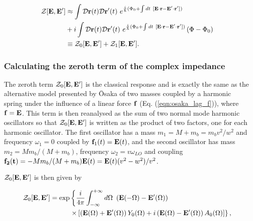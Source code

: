 \begin{equation}
    \begin{aligned}
    \mathcal{Z}[\vb{E}, \vb{E'}] &\approx \int \mathcal{D}\vb{r}(t)\mathcal{D}\vb{r'}(t)\ e^{\frac{i}{\hbar} (\Phi_0 + \int dt\ [\vb{E} \cdot \vb{r} - \vb{E'} \cdot \vb{r'}])} \\
    &+ i\int \mathcal{D}\mathbf{r}(t) \mathcal{D}\mathbf{r'}(t)\ e^{\frac{i}{\hbar} (\Phi_0 + \int dt\ [\vb{E} \cdot \vb{r} - \vb{E'} \cdot \vb{r'}])}\left(\Phi - \Phi_0\right) \\
    &\equiv \mathcal{Z}_0[\vb{E}, \vb{E'}] + \mathcal{Z}_1[\vb{E}, \vb{E'}].
    \end{aligned}
\end{equation}

\subsubsection{Calculating the zeroth term of the complex impedance}
\label{subsubsec:2-3-1-2}

The zeroth term $\mathcal{Z}_0[\vb{E}, \vb{E'}]$ is the classical response and is exactly the same as the alternative model presented by \=Osaka of two masses coupled by a harmonic spring under the influence of a linear force $\vb{f}$ (Eq. (\ref{eqn:osaka_lag_f})), where $\vb{f} = \vb{E}$. This term is then reanalysed as the sum of two normal mode harmonic oscillators so that $\mathcal{Z}_0[\vb{E}, \vb{E'}]$ is written as the product of two factors, one for each harmonic oscillator. The first oscillator has a mass $m_1 = M + m_b = m_b v^2 / w^2$ and frequency $\omega_1 = 0$ coupled by $\vb{f}_1(t) = \vb{E}(t)$, and the second oscillator has mass $m_2 = M m_b / (M + m_b)$, frequency $\omega_2 = v \omega_{LO}$ and coupling $\vb{f_2(t)} = - M m_b / (M + m_b) \vb{E}(t) = \vb{E}(t) (v^2 - w^2) / v^2$. 

$\mathcal{Z}_0[\vb{E}, \vb{E'}]$ is then given by

\begin{equation}\label{eqn:Z0}
    \begin{aligned}
        \mathcal{Z}_0[\vb{E}, \vb{E'}] = \exp &\left\{ \frac{i}{4\pi} \int^{+\infty}_{-\infty}d\Omega\ \left( \vb{E}(-\Omega) - \vb{E'}(\Omega) \right) \right. \\
        &\left. \times \left[ \left( \vb{E}(\Omega) + \vb{E'}(\Omega) \right) Y_0(\Omega)
         + i \left( \vb{E}(\Omega) - \vb{E'}(\Omega) \right) A_0(\Omega) \right]\right\},
    \end{aligned}
\end{equation}

